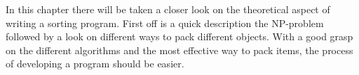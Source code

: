 In this chapter there will be taken a closer look on the theoretical aspect of writing a sorting program. First off is a quick description the NP-problem followed by a look on different ways to pack different objects.
With a good grasp on the different algorithms and the most effective way to pack items, the process of developing a program should be easier.